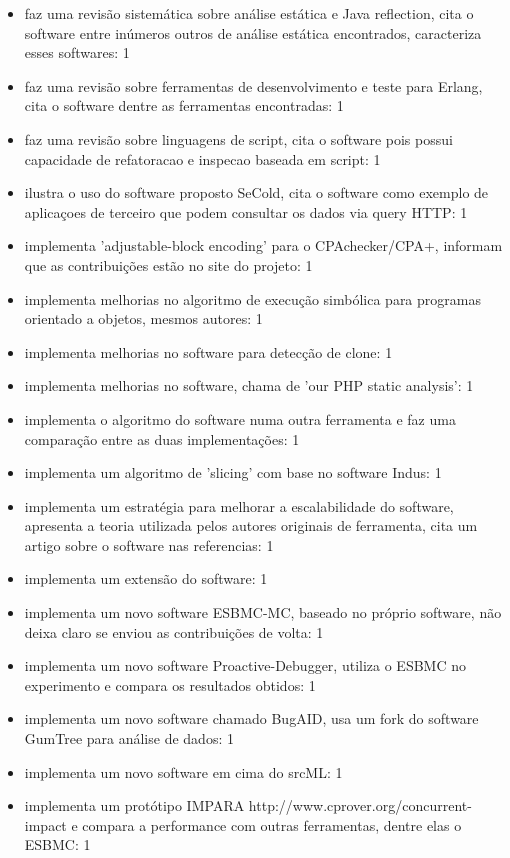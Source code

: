 \begin{itemize}
\item faz uma revisão sistemática sobre análise estática e Java reflection, cita o software entre inúmeros outros de análise estática encontrados, caracteriza esses softwares: 1
\item faz uma revisão sobre ferramentas de desenvolvimento e teste para Erlang, cita o software dentre as ferramentas encontradas: 1
\item faz uma revisão sobre linguagens de script, cita o software pois possui capacidade de refatoracao e inspecao baseada em script: 1
\item ilustra o uso do software proposto SeCold, cita o software como exemplo de aplicaçoes de terceiro que podem consultar os dados via query HTTP: 1
\item implementa 'adjustable-block encoding' para o CPAchecker/CPA+, informam que as contribuições estão no site do projeto: 1
\item implementa melhorias no algoritmo de execução simbólica para programas orientado a objetos, mesmos autores: 1
\item implementa melhorias no software para detecção de clone: 1
\item implementa melhorias no software, chama de 'our PHP static analysis': 1
\item implementa o algoritmo do software numa outra ferramenta e faz uma comparação entre as duas implementações: 1
\item implementa um algoritmo de 'slicing' com base no software Indus: 1
\item implementa um estratégia para melhorar a escalabilidade do software, apresenta a teoria utilizada pelos autores originais de ferramenta, cita um artigo sobre o software nas referencias: 1
\item implementa um extensão do software: 1
\item implementa um novo software ESBMC-MC, baseado no próprio software, não deixa claro se enviou as contribuições de volta: 1
\item implementa um novo software Proactive-Debugger, utiliza o ESBMC no experimento e compara os resultados obtidos: 1
\item implementa um novo software chamado BugAID, usa um fork do software GumTree para análise de dados: 1
\item implementa um novo software em cima do srcML: 1
\item implementa um protótipo IMPARA http://www.cprover.org/concurrent-impact e compara a performance com outras ferramentas, dentre elas o ESBMC: 1

\end{itemize}
